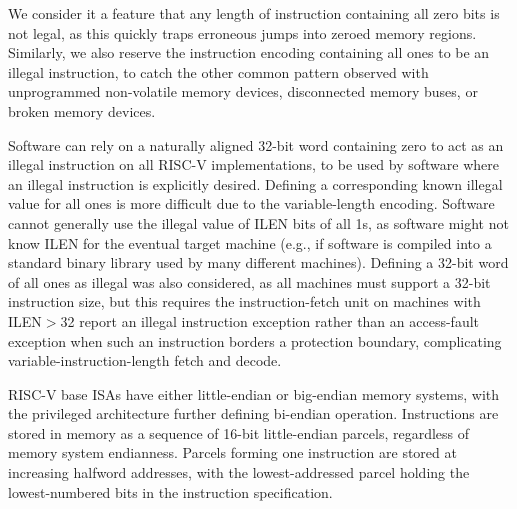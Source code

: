 \begin{commentary}
We consider it a feature that any length of instruction containing all
zero bits is not legal, as this quickly traps erroneous jumps into
zeroed memory regions. Similarly, we also reserve the instruction
encoding containing all ones to be an illegal instruction, to catch
the other common pattern observed with unprogrammed non-volatile
memory devices, disconnected memory buses, or broken memory devices.

Software can rely on a naturally aligned 32-bit word containing zero to
act as an illegal instruction on all RISC-V implementations, to be used
by software where an illegal instruction is explicitly desired.
Defining a corresponding known illegal value for all ones is more
difficult due to the variable-length encoding.  Software cannot
generally use the illegal value of ILEN bits of all 1s, as software
might not know ILEN for the eventual target machine (e.g., if software
is compiled into a standard binary library used by many different
machines).  Defining a 32-bit word of all ones as illegal was also
considered, as all machines must support a 32-bit instruction size, but
this requires the instruction-fetch unit on machines with ILEN$>$32
report an illegal instruction exception rather than an access-fault
exception when such an instruction borders a protection boundary,
complicating variable-instruction-length fetch and decode.
\end{commentary}

RISC-V base ISAs have either little-endian or big-endian memory systems,
with the privileged architecture further defining bi-endian operation.
Instructions are stored in memory as a sequence of 16-bit little-endian
parcels, regardless of memory system endianness.
Parcels forming one instruction are stored at increasing
halfword addresses, with the lowest-addressed parcel holding the
lowest-numbered bits in the instruction specification.

